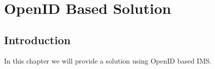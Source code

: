 \chapter{OpenID Based Solution}
\section{Introduction}
In this chapter we will provide a solution using OpenID based IMS.